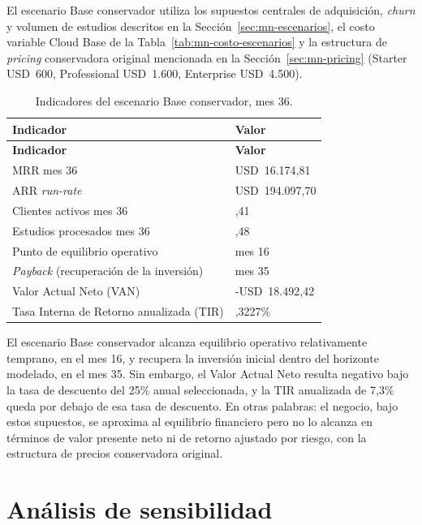 El escenario Base conservador utiliza los supuestos centrales de adquisición, \textit{churn} y volumen de estudios descritos en la Sección~\ref{sec:mn-escenarios}, el costo variable Cloud Base de la Tabla~\ref{tab:mn-costo-escenarios} y la estructura de \textit{pricing} conservadora original mencionada en la Sección~\ref{sec:mn-pricing} (Starter USD~600, Professional USD~1.600, Enterprise USD~4.500).

{\scriptsize
\setlength{\LTleft}{0pt}
\setlength{\LTright}{0pt}
\setlength{\tabcolsep}{3pt}
\renewcommand{\arraystretch}{1.18}
\begin{longtable}{>{\raggedright\arraybackslash}p{} >{\raggedright\arraybackslash}p{}}
\caption{Indicadores del escenario Base conservador, mes 36.}\label{tab:mn-base-resultado}\\
\hline
\textbf{Indicador} & \textbf{Valor} \\
\hline
\endfirsthead
\hline
\textbf{Indicador} & \textbf{Valor} \\
\hline
\endhead
\hline
\endfoot
MRR mes 36 & USD~16.174,81 \\
ARR \textit{run-rate} & USD~194.097,70 \\
Clientes activos mes 36 & 13,41 \\
Estudios procesados mes 36 & 4.185,48 \\
Punto de equilibrio operativo & mes 16 \\
\textit{Payback} (recuperación de la inversión) & mes 35 \\
Valor Actual Neto (VAN) & -USD~18.492,42 \\
Tasa Interna de Retorno anualizada (TIR) & 7,3227\% \\
\hline
\end{longtable}
}

El escenario Base conservador alcanza equilibrio operativo relativamente temprano, en el mes 16, y recupera la inversión inicial dentro del horizonte modelado, en el mes 35. Sin embargo, el Valor Actual Neto resulta negativo bajo la tasa de descuento del 25\% anual seleccionada, y la TIR anualizada de 7,3\% queda por debajo de esa tasa de descuento. En otras palabras: el negocio, bajo estos supuestos, se aproxima al equilibrio financiero pero no lo alcanza en términos de valor presente neto ni de retorno ajustado por riesgo, con la estructura de precios conservadora original.

\section{Análisis de sensibilidad}
\label{sec:mn-sensibilidad}

